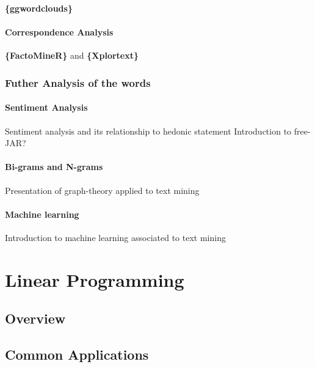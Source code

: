 \documentclass[
]{book}
\begin{document}
\textbf{\{ggwordclouds\}}

\hypertarget{correspondence-analysis}{%
\subsubsection{Correspondence Analysis}\label{correspondence-analysis}}

\textbf{\{FactoMineR\}} and \textbf{\{Xplortext\}}

\hypertarget{futher-analysis-of-the-words}{%
\subsection{Futher Analysis of the words}\label{futher-analysis-of-the-words}}

\hypertarget{sentiment-analysis-1}{%
\subsubsection{Sentiment Analysis}\label{sentiment-analysis-1}}

Sentiment analysis and its relationship to hedonic statement
Introduction to free-JAR?

\hypertarget{bi-grams-and-n-grams}{%
\subsubsection{Bi-grams and N-grams}\label{bi-grams-and-n-grams}}

Presentation of graph-theory applied to text mining

\hypertarget{machine-learning}{%
\subsubsection{Machine learning}\label{machine-learning}}

Introduction to machine learning associated to text mining

\hypertarget{linear-programming}{%
\chapter{Linear Programming}\label{linear-programming}}

\hypertarget{overview-2}{%
\section{Overview}\label{overview-2}}

\hypertarget{common-applications-2}{%
\section{Common Applications}\label{common-applications-2}}
\end{document}
